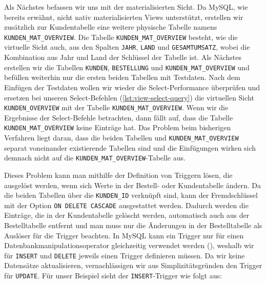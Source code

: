 Als Nächstes befassen wir uns mit der materialisierten Sicht.
Da MySQL, wie bereits erwähnt, nicht nativ materialisierten Views unterstützt, erstellen wir zusätzlich zur Kundentabelle eine weitere physische Tabelle namens \texttt{KUNDEN\_MAT\_OVERVIEW}.
Die Tabelle \texttt{KUNDEN\_MAT\_OVERVIEW} besteht, wie die virtuelle Sicht auch, aus den Spalten \texttt{JAHR}, \texttt{LAND} und \texttt{GESAMTUMSATZ}, wobei die Kombination aus Jahr und Land der Schlüssel der Tabelle ist.
Als Nächstes erstellen wir die Tabellen \texttt{KUNDEN}, \texttt{BESTELLUNG} und \texttt{KUNDEN\_MAT\_OVERVIEW} und befüllen weiterhin nur die ersten beiden Tabellen mit Testdaten.
Nach dem Einfügen der Testdaten wollen wir wieder die Select-Performance überprüfen und ersetzen bei unseren Select-Befehlen (\ref{lst:view-select-query}) die virtuellen Sicht \texttt{KUNDEN\_OVERVIEW} mit der Tabelle \texttt{KUNDEN\_MAT\_OVERVIEW}.
Wenn wir die Ergebnisse der Select-Befehle betrachten, dann fällt auf, dass die Tabelle \texttt{KUNDEN\_MAT\_OVERVIEW} keine Einträge hat.
Das Problem beim bisherigen Verfahren liegt daran, dass die beiden Tabellen und \texttt{KUNDEN\_MAT\_OVERVIEW} separat voneinander existierende Tabellen sind und die Einfügungen wirken sich demnach nicht auf die \texttt{KUNDEN\_MAT\_OVERVIEW}-Tabelle aus.

Dieses Problem kann man mithilfe der Definition von Triggern lösen, die ausgelöst werden, wenn sich Werte in der Bestell- oder Kundentabelle ändern.
Da die beiden Tabellen über die \texttt{KUNDEN\_ID} verknüpft sind, kann der Fremdschlüssel mit der Option \texttt{ON DELETE CASCADE} ausgestattet werden.
Dadurch werden die Einträge, die in der Kundentabelle gelöscht werden, automatisch auch aus der Bestelltabelle entfernt und man muss nur die Änderungen in der Bestelltabelle als Auslöser für die Trigger beachten.
In MySQL kann ein Trigger nur für einen Datenbankmanipulationsoperator gleichzeitig verwendet werden (\cite{mysql_trigger_syntax}), weshalb wir für \texttt{INSERT} und \texttt{DELETE} jeweils einen Trigger definieren müssen.
Da wir keine Datensätze aktualisieren, vernachlässigen wir aus Simplizitätsgründen den Trigger für \texttt{UPDATE}.
\newpage
Für unser Beispiel sieht der \texttt{INSERT}-Trigger wie folgt aus:

\vspace{-5pt}


